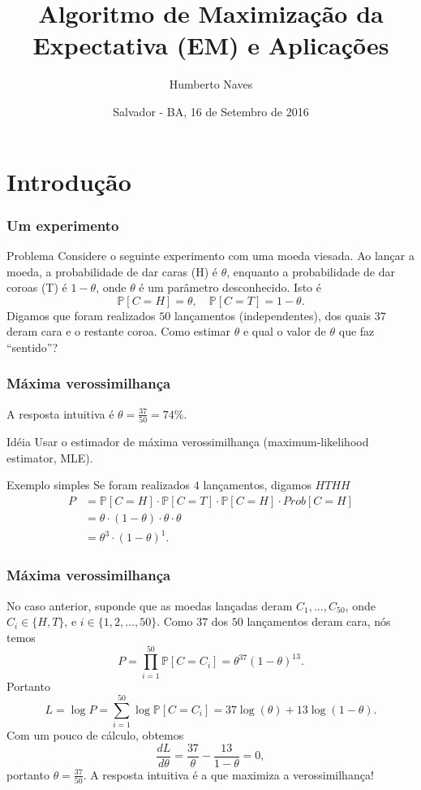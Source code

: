 \documentclass{beamer}
\title{Algoritmo de Maximização da Expectativa (EM) e Aplicações}
\author{Humberto Naves}
\date{Salvador - BA, 16 de Setembro de 2016}
\newcommand{\Prob}{\mathbb{P}}
\begin{document}
\maketitle


\section{Introdução}
\begin{frame}

	\frametitle{Um experimento}
	\begin{block}{Problema}
		Considere o seguinte experimento com uma moeda viesada. \pause
		Ao lançar a moeda, a probabilidade de dar caras (H) é $\theta$,
		enquanto a probabilidade de dar coroas (T) é $1-\theta$,
		onde $\theta$ é um parâmetro desconhecido. \pause Isto é
		\[
			\Prob[C=H] = \theta, \quad \Prob[C=T]=1-\theta.
		\]
		\pause
		Digamos que foram realizados $50$ lançamentos (independentes), dos
		quais $37$ deram cara e o restante coroa. Como estimar $\theta$
		e qual o valor de $\theta$ que faz ``sentido''?
	\end{block}


\end{frame}

\begin{frame}

	\frametitle{Máxima verossimilhança}
	A resposta intuitiva é $\theta = \frac{37}{50} = 74\%$.
	\pause
	\begin{alertblock}{Idéia}
		Usar o estimador de máxima verossimilhança (maximum-likelihood
		estimator, MLE).
	\end{alertblock}
	\pause
	\begin{exampleblock}{Exemplo simples}
		Se foram realizados $4$ lançamentos, digamos $HTHH$
		\begin{align*}
			P &= \Prob[C=H]\cdot\Prob[C=T]\cdot \Prob[C=H]\cdot Prob[C=H]\\
			&= \theta \cdot (1-\theta) \cdot \theta \cdot \theta \\
			&= \theta^3 \cdot (1-\theta)^1.
		\end{align*}
	\end{exampleblock}

\end{frame}

\begin{frame}

	\frametitle{Máxima verossimilhança}
	No caso anterior, suponde que as moedas lançadas deram $C_1,\ldots,C_{50}$,
	onde $C_i \in \{H, T\}$, e $i\in \{1,2,\ldots, 50\}$. \pause
	Como $37$ dos $50$ lançamentos deram cara, nós temos
	\[
	  P = \prod_{i=1}^{50} \Prob[C = C_i] = \theta^{37}(1-\theta)^{13}.
	\]
	\pause
	Portanto
	\[
	  L = \log P = \sum_{i=1}^{50} \log \Prob[C=C_i] = 37 \log(\theta)
	  +13 \log(1-\theta).
	\]
	\pause
	Com um pouco de cálculo, obtemos
	\[
	\frac{d L}{d \theta} = \frac{37}{\theta} - \frac{13}{1-\theta} = 0,
	\]
	\pause
	portanto $\theta = \frac{37}{50}$. \pause
	A resposta intuitiva é a que maximiza a verossimilhança!

\end{frame}
\end{document}
